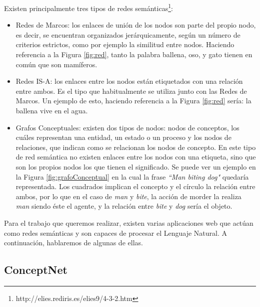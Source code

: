 Existen principalmente tres tipos de redes semánticas\footnote{http://elies.rediris.es/elies9/4-3-2.htm}:
\begin{itemize}
	\item Redes de Marcos: los enlaces de unión de los nodos son parte del propio nodo, es decir, se encuentran organizados jerárquicamente, según un número de criterios estrictos, como por ejemplo la similitud entre nodos. Haciendo referencia a la Figura \ref{fig:red}, tanto la palabra ballena, oso, y gato tienen en común que son mamíferos.
	\item Redes IS-A: los enlaces entre los nodos están etiquetados con una relación entre ambos. Es el tipo que habitualmente se utiliza junto con las Redes de Marcos. Un ejemplo de esto, haciendo referencia a la Figura \ref{fig:red} sería: la ballena vive en el agua. 
	\item Grafos Conceptuales: existen dos tipos de nodos: nodos de conceptos, los cuáles representan una entidad, un estado o un proceso y los nodos de relaciones, que indican como se relacionan los nodos de concepto. En este tipo de red semántica no existen enlaces entre los nodos con una etiqueta, sino que son los propios nodos los que tienen el significado. Se puede ver un ejemplo en la Figura \ref{fig:grafoConceptual} \citep{osti_5673179} en la cual la frase \textit{``Man biting dog"} quedaría representada. Los cuadrados implican el concepto y el círculo la relación entre ambos, por lo que en el caso de \textit{man} y \textit{bite}, la acción de morder la realiza \textit{man} siendo éste el agente, y la relación entre \textit{bite} y \textit{dog} sería el objeto.
\end{itemize}
Para el trabajo que queremos realizar, existen varias aplicaciones web que actúan como redes semánticas y son capaces de procesar el Lenguaje Natural.  A continuación, hablaremos de algunas de ellas.

\subsection{ConceptNet} 
\label{cap:subsec:concepnet}

